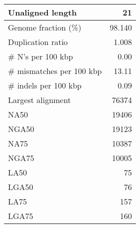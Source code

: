 \documentclass[12pt,a4paper]{article}
\begin{document}
\begin{table}[ht]
\begin{center}
\begin{tabular}{|l*{1}{|r}|}
Unaligned length & 21 \\ \hline
Genome fraction (\%) & 98.140 \\ \hline
Duplication ratio & 1.008 \\ \hline
\# N's per 100 kbp & 0.00 \\ \hline
\# mismatches per 100 kbp & 13.11 \\ \hline
\# indels per 100 kbp & 0.09 \\ \hline
Largest alignment & 76374 \\ \hline
NA50 & 19406 \\ \hline
NGA50 & 19123 \\ \hline
NA75 & 10387 \\ \hline
NGA75 & 10005 \\ \hline
LA50 & 75 \\ \hline
LGA50 & 76 \\ \hline
LA75 & 157 \\ \hline
LGA75 & 160 \\ \hline
\end{tabular}
\end{center}
\end{table}
\end{document}
